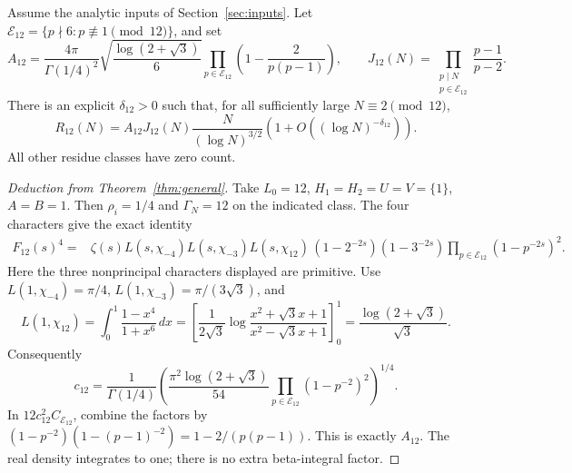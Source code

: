 \begin{theorem}\label{thm:c12}
Assume the analytic inputs of Section~\ref{sec:inputs}.
Let \(\mathcal E_{12}=\{p\nmid6:p\not\equiv1\pmod{12}\}\), and set
\[
 A_{12}=\frac{4\pi}{\Gamma(1/4)^2}
       \sqrt{\frac{\log(2+\sqrt3)}{6}}
       \prod_{p\in\mathcal E_{12}}
                        \left(1-\frac{2}{p(p-1)}\right),\qquad
 J_{12}(N)=\prod_{\substack{p\mid N\\p\in\mathcal E_{12}}}
                                      \frac{p-1}{p-2}.
\]
There is an explicit \(\delta_{12}>0\) such that, for all sufficiently
large \(N\equiv2\pmod{12}\),
\[
 R_{12}(N)=A_{12}J_{12}(N)\frac{N}{(\log N)^{3/2}}
                 \left(1+O((\log N)^{-\delta_{12}})\right).
\]
All other residue classes have zero count.
\end{theorem}
\begin{proof}[Deduction from Theorem~\ref{thm:general}]
Take \(L_0=12\), \(H_1=H_2=U=V=\{1\}\), \(A=B=1\).
Then \(\rho_i=1/4\) and \(\Gamma_N=12\) on the indicated class.
The four characters give the exact identity
\begin{align*}
 F_{12}(s)^4={}&\zeta(s)L(s,\chi_{-4})L(s,\chi_{-3})L(s,\chi_{12})\,
        (1-2^{-2s})(1-3^{-2s})
        \prod_{p\in\mathcal E_{12}}(1-p^{-2s})^2.
\end{align*}
Here the three nonprincipal characters displayed are primitive.
Use \(L(1,\chi_{-4})=\pi/4\),
\(L(1,\chi_{-3})=\pi/(3\sqrt3)\), and
\[
 L(1,\chi_{12})=\int_0^1\frac{1-x^4}{1+x^6}\,dx
 =\left[\frac{1}{2\sqrt3}
 \log\frac{x^2+\sqrt3x+1}{x^2-\sqrt3x+1}\right]_0^1
 =\frac{\log(2+\sqrt3)}{\sqrt3}.
\]
Consequently
\[
 c_{12}=\frac{1}{\Gamma(1/4)}
 \left(\frac{\pi^2\log(2+\sqrt3)}{54}
       \prod_{p\in\mathcal E_{12}}(1-p^{-2})^2\right)^{1/4}.
\]
In \(12c_{12}^2C_{\mathcal E_{12}}\), combine the factors by
\((1-p^{-2})(1-(p-1)^{-2})=1-2/(p(p-1))\).
This is exactly \(A_{12}\). The real density integrates to one;
there is no extra beta-integral factor.
\end{proof}

